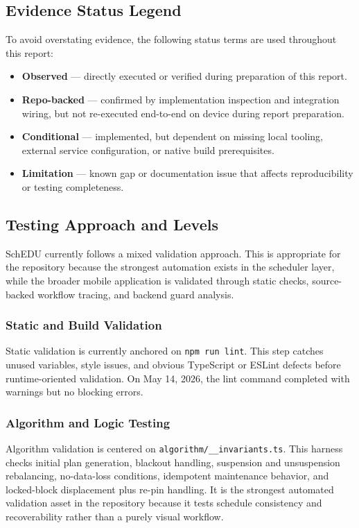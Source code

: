 \documentclass[12pt]{article}
\begin{document}
\subsection{Evidence Status Legend}

To avoid overstating evidence, the following status terms are used throughout this report:
\begin{itemize}
    \item \textbf{Observed} --- directly executed or verified during preparation of this report.
    \item \textbf{Repo-backed} --- confirmed by implementation inspection and integration wiring, but not re-executed end-to-end on device during report preparation.
    \item \textbf{Conditional} --- implemented, but dependent on missing local tooling, external service configuration, or native build prerequisites.
    \item \textbf{Limitation} --- known gap or documentation issue that affects reproducibility or testing completeness.
\end{itemize}

\subsection{Testing Approach and Levels}

SchEDU currently follows a mixed validation approach. This is appropriate for the repository because the strongest automation exists in the scheduler layer, while the broader mobile application is validated through static checks, source-backed workflow tracing, and backend guard analysis.

\subsubsection{Static and Build Validation}

Static validation is currently anchored on \texttt{npm run lint}. This step catches unused variables, style issues, and obvious TypeScript or ESLint defects before runtime-oriented validation. On May 14, 2026, the lint command completed with warnings but no blocking errors.

\subsubsection{Algorithm and Logic Testing}

Algorithm validation is centered on \nolinkurl{algorithm/__invariants.ts}. This harness checks initial plan generation, blackout handling, suspension and unsuspension rebalancing, no-data-loss conditions, idempotent maintenance behavior, and locked-block displacement plus re-pin handling. It is the strongest automated validation asset in the repository because it tests schedule consistency and recoverability rather than a purely visual workflow.
\end{document}
